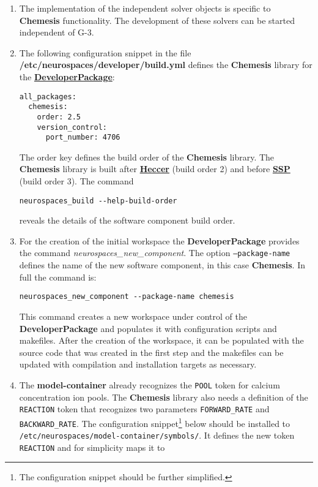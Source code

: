 \documentclass[12pt]{article}
\begin{document}
\begin{enumerate}
\item The implementation of the independent solver objects is specific
  to {\bf Chemesis} functionality.  The development of these solvers
  can be started independent of G-3.
\item The following configuration snippet in the file {\bf
    /etc/neurospaces/developer/build.yml} defines the {\bf Chemesis}
  library for the
  \href{../developer-package/developer-package.tex}{\bf
    DeveloperPackage}:
\begin{verbatim}
all_packages:
  chemesis:
    order: 2.5
    version_control:
      port_number: 4706
\end{verbatim}
  The order key defines the build order of the {\bf Chemesis} library.
  The {\bf Chemesis} library is built after
  \href{../heccer/heccer.tex}{\bf Heccer} (build order 2) and before
  \href{../ssp/ssp.tex}{\bf SSP} (build order 3).  The command
\begin{verbatim}
neurospaces_build --help-build-order
\end{verbatim}
  reveals the details of the software component build order.
\item For the creation of the initial workspace the {\bf
    DeveloperPackage} provides the command {\it
    neurospaces\_new\_component}.  The option {\tt --package-name}
  defines the name of the new software component, in this case {\bf
    Chemesis}.  In full the command is:
\begin{verbatim}
neurospaces_new_component --package-name chemesis
\end{verbatim}
  This command creates a new workspace under control of the {\bf
    DeveloperPackage} and populates it with configuration scripts and
  makefiles.  After the creation of the workspace, it can be populated
  with the source code that was created in the first step and the
  makefiles can be updated with compilation and installation targets
  as necessary.
\item The {\bf model-container} already recognizes the {\tt POOL}
  token for calcium concentration ion pools.  The {\bf Chemesis}
  library also needs a definition of the {\tt REACTION} token that
  recognizes two parameters {\tt FORWARD\_RATE} and {\tt
    BACKWARD\_RATE}.  The configuration snippet\footnote{The
    configuration snippet should be further simplified.} below should
  be installed to {\tt /etc/neurospaces/model-container/symbols/}.  It
  defines the new token {\tt REACTION} and for simplicity maps it to

\end{enumerate}
\end{document}
